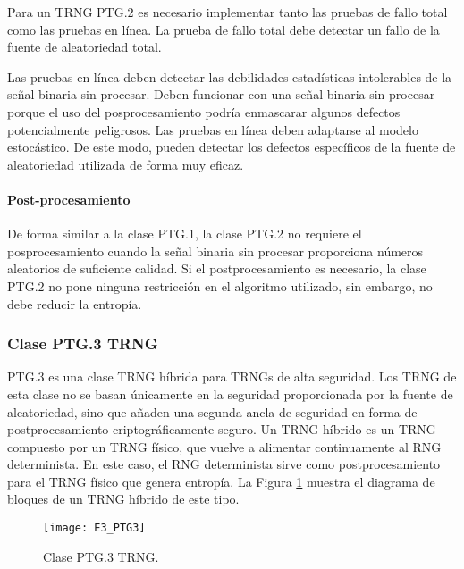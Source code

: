                 Para un TRNG PTG.2 es necesario implementar tanto las pruebas de fallo total como las pruebas en línea. La prueba de fallo total debe detectar un fallo de la fuente de aleatoriedad total.

                Las pruebas en línea deben detectar las debilidades estadísticas intolerables de la señal binaria sin procesar. Deben funcionar con una señal binaria sin procesar porque el uso del posprocesamiento podría enmascarar algunos defectos potencialmente peligrosos. Las pruebas en línea deben adaptarse al modelo estocástico. De este modo, pueden detectar los defectos específicos de la fuente de aleatoriedad utilizada de forma muy eficaz.

                \paragraph{Post-procesamiento\\}
                
                De forma similar a la clase PTG.1, la clase PTG.2 no requiere el posprocesamiento cuando la señal binaria sin procesar proporciona números aleatorios de suficiente calidad. Si el postprocesamiento es necesario, la clase PTG.2 no pone ninguna restricción en el algoritmo utilizado, sin embargo, no debe reducir la entropía.

            \subsubsection{Clase PTG.3 TRNG}
            
                PTG.3 es una clase TRNG híbrida para TRNGs de alta seguridad. Los TRNG de esta clase no se basan únicamente en la seguridad proporcionada por la fuente de aleatoriedad, sino que añaden una segunda ancla de seguridad en forma de postprocesamiento criptográficamente seguro. Un TRNG híbrido es un TRNG compuesto por un TRNG físico, que vuelve a alimentar continuamente al RNG determinista. En este caso, el RNG determinista sirve como postprocesamiento para el TRNG físico que genera entropía. La Figura \ref{fig:E3_PTG3} muestra el diagrama de bloques de un TRNG híbrido de este tipo.

                \begin{figure}[hbtp]
                    \caption{Clase PTG.3 TRNG.}
                    \centering
                    \texttt{[image: E3\_PTG3]}
                    \label{fig:E3_PTG3}
                \end{figure}
            
